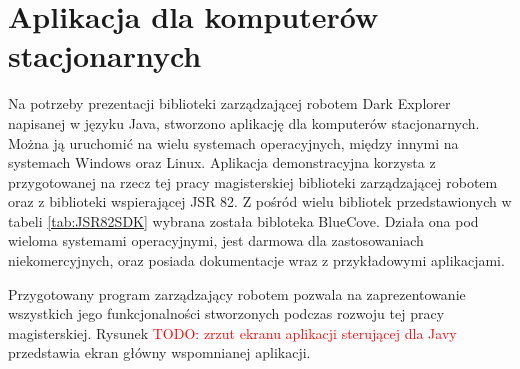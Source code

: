 \section{Aplikacja dla komputerów stacjonarnych}
\label{sec:java-app}
Na potrzeby prezentacji biblioteki zarządzającej robotem Dark Explorer napisanej
w języku Java, stworzono aplikację dla komputerów stacjonarnych. Można ją
uruchomić na wielu systemach operacyjnych, między innymi na systemach Windows
oraz Linux. Aplikacja demonstracyjna korzysta z przygotowanej na rzecz tej pracy
magisterskiej biblioteki zarządzającej robotem oraz z biblioteki wspierającej JSR
82. Z pośród wielu bibliotek przedstawionych w tabeli \ref{tab:JSR82SDK} wybrana
została bibloteka BlueCove\cite{website:bluecove.org}. Działa ona pod wieloma
systemami operacyjnymi, jest darmowa dla zastosowaniach niekomercyjnych, oraz
posiada dokumentacje wraz z przykładowymi aplikacjami.

Przygotowany program zarządzający robotem pozwala na zaprezentowanie wszystkich
jego funkcjonalności stworzonych podczas rozwoju tej pracy magisterskiej. Rysunek
\textcolor{red}{TODO: zrzut ekranu aplikacji sterującej dla Javy} przedstawia
ekran główny wspomnianej aplikacji.
